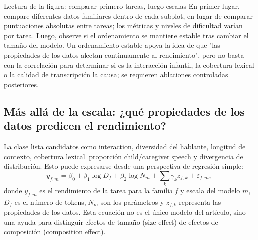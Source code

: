 

\begin{knowledgebox}{Lectura de la figura: comparar primero tareas, luego escalas}
En primer lugar, compare diferentes datos familiares dentro de cada subplot, en lugar de comparar puntuaciones absolutas entre tareas; los métricas y niveles de dificultad varían por tarea. Luego, observe si el ordenamiento se mantiene estable tras cambiar el tamaño del modelo. Un ordenamiento estable apoya la idea de que "las propiedades de los datos afectan continuamente al rendimiento", pero no basta con la correlación para determinar si es la interacción infantil, la cobertura lexical o la calidad de transcripción la causa; se requieren ablaciones controladas posteriores.
\end{knowledgebox}

\subsection{Más allá de la escala: ¿qué propiedades de los datos predicen el rendimiento?}

La clase lista candidatos como interaction, diversidad del hablante, longitud de contexto, cobertura lexical, proporción child/caregiver speech y divergencia de distribución. Esto puede expresarse desde una perspectiva de regresión simple:
\[
y_{f,m}=\beta_0+\beta_1\log D_f+\beta_2\log N_m
+\sum_k\gamma_k z_{f,k}+\varepsilon_{f,m},
\]
donde $y_{f,m}$ es el rendimiento de la tarea para la familia $f$ y escala del modelo $m$, $D_f$ es el número de tokens, $N_m$ son los parámetros y $z_{f,k}$ representa las propiedades de los datos. Esta ecuación no es el único modelo del artículo, sino una ayuda para distinguir efectos de tamaño (size effect) de efectos de composición (composition effect).




